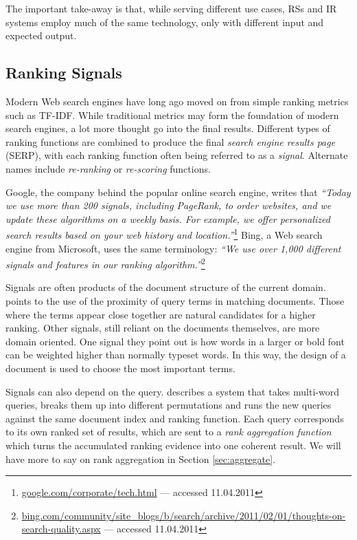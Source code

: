 The important take-away is that, while serving different use cases, RSs and IR systems 
employ much of the same technology, only with different input and expected output.


\subsection{Ranking Signals}
\label{subsec:signals}

Modern Web search engines have long ago moved on from simple ranking metrics such as TF-IDF.
While traditional metrics may form the foundation of modern search engines, a lot more thought go into the final results.
Different types of ranking functions are combined to produce the final \emph{search engine results page} (SERP),
with each ranking function often being referred to as a \emph{signal}. Alternate names include
\emph{re-ranking} or \emph{re-scoring} functions.

Google, the company behind the popular online search engine, writes that \emph{``Today we use more than 200 signals, including PageRank, 
to order websites, and we update these algorithms on a weekly basis.
For example, we offer personalized search results based on your web history and 
location.''}\footnote{\url{google.com/corporate/tech.html} --- accessed 11.04.2011}
Bing, a Web search engine from Microsoft, uses the same terminology:
\emph{``We use over 1,000 different signals and features in our ranking 
algorithm.''}\footnote{\url{bing.com/community/site_blogs/b/search/archive/2011/02/01/thoughts-on-search-quality.aspx} --- accessed 11.04.2011}

Signals are often products of the document structure of the current domain.
\citet[p.5]{Bender2005} points to the use of the proximity of query terms in matching documents.
Those where the terms appear close together are natural candidates for a higher ranking.
Other signals, still reliant on the documents themselves, are more domain oriented.
One signal they point out is how words in a larger or bold font can be weighted 
higher than normally typeset words.
In this way, the design of a document is used to choose the most important terms. 

Signals can also depend on the query. \citet[p.145]{Manning2008} describes a system that takes
multi-word queries, breaks them up into different permutations and runs the new queries against the same
document index and ranking function. Each query corresponds to its own ranked set of results,
which are sent to a \emph{rank aggregation function} which turns the accumulated ranking evidence
into one coherent result. We will have more to say on rank aggregation in Section \ref{sec:aggregate}.  

